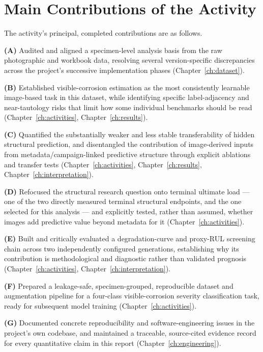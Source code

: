 \section{Main Contributions of the Activity}
\label{sec:intro-contributions}

The activity's principal, completed contributions are as follows.

\textbf{(A)} Audited and aligned a specimen-level analysis basis from the
raw photographic and workbook data, resolving several version-specific
discrepancies across the project's successive implementation phases
(Chapter~\ref{ch:dataset}).

\textbf{(B)} Established visible-corrosion estimation as the most
consistently learnable image-based task in this dataset, while
identifying specific label-adjacency and near-tautology risks that limit
how some individual benchmarks should be read
(Chapter~\ref{ch:activities}, Chapter~\ref{ch:results}).

\textbf{(C)} Quantified the substantially weaker and less stable
transferability of hidden structural prediction, and disentangled the
contribution of image-derived inputs from metadata/campaign-linked
predictive structure through explicit ablations and transfer tests
(Chapter~\ref{ch:activities}, Chapter~\ref{ch:results},
Chapter~\ref{ch:interpretation}).

\textbf{(D)} Refocused the structural research question onto terminal
ultimate load — one of the two directly measured terminal structural
endpoints, and the one selected for this analysis — and explicitly
tested, rather than assumed, whether images add predictive value beyond
metadata for it (Chapter~\ref{ch:activities}).

\textbf{(E)} Built and critically evaluated a degradation-curve and
proxy-RUL screening chain across two independently configured
generations, establishing why its contribution is methodological and
diagnostic rather than validated prognosis
(Chapter~\ref{ch:activities}, Chapter~\ref{ch:interpretation}).

\textbf{(F)} Prepared a leakage-safe, specimen-grouped, reproducible
dataset and augmentation pipeline for a four-class visible-corrosion
severity classification task, ready for subsequent model training
(Chapter~\ref{ch:activities}).

\textbf{(G)} Documented concrete reproducibility and software-engineering
issues in the project's own codebase, and maintained a traceable,
source-cited evidence record for every quantitative claim in this report
(Chapter~\ref{ch:engineering}).

